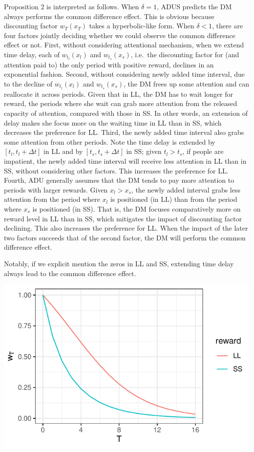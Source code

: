 \documentclass[
  12pt,
]{article}
\begin{document}
Proposition 2 is interpreted as follows. When \(\delta = 1\), ADUS
predicts the DM always performs the common difference effect. This is
obvious because discounting factor \(w_T(x_T)\) takes a hyperbolic-like
form. When \(\delta<1\), there are four factors jointly deciding whether
we could observe the common difference effect or not. First, without
considering attentional mechanism, when we extend time delay, each of
\(w_{t_l}(x_l)\) and \(w_{t_s}(x_s)\), i.e.~the discounting factor for
(and attention paid to) the only period with positive reward, declines
in an exponential fashion. Second, without considering newly added time
interval, due to the decline of \(w_{t_l}(x_l)\) and \(w_{t_s}(x_s)\),
the DM frees up some attention and can reallocate it across periods.
Given that in LL, the DM has to wait longer for reward, the periods
where she wait can grab more attention from the released capacity of
attention, compared with those in SS. In other words, an extension of
delay makes she focus more on the waiting time in LL than in SS, which
decreases the preference for LL. Third, the newly added time interval
also grabs some attention from other periods. Note the time delay is
extended by \([t_l,t_l+\Delta t]\) in LL and by \([t_s, t_s+\Delta t]\)
in SS; given \(t_l>t_s\), if people are impatient, the newly added time
interval will receive less attention in LL than in SS, without
considering other factors. This increases the preference for LL. Fourth,
ADU generally assumes that the DM tends to pay more attention to periods
with larger rewards. Given \(x_l>x_s\), the newly added interval grabs
less attention from the period where \(x_l\) is positioned (in LL) than
from the period where \(x_s\) is positioned (in SS). That is, the DM
focuses comparatively more on reward level in LL than in SS, which
mitigates the impact of discounting factor declining. This also
increases the preference for LL. When the impact of the later two
factors succeeds that of the second factor, the DM will perform the
common difference effect.

Notably, if we explicit mention the zeros in LL and SS, extending time
delay always lead to the common difference effect.

\includegraphics{images/weight_LLvSS.pdf}
\end{document}
